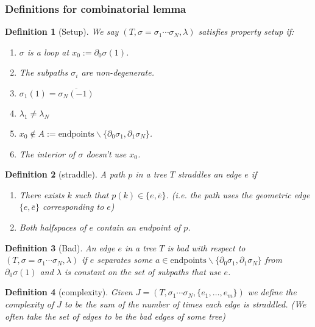 \documentclass{article}
\theoremstyle{mystyle}
\newtheorem{defn}{Definition}
\theoremstyle{remark}
\begin{document}
\subsubsection{Definitions for combinatorial lemma}
\begin{defn}
    [Setup]
    \label{def:setup} 
    We say \((T, \sigma = \sigma_{1} \cdots \sigma_{N} , \lambda)\) satisfies property {\em setup} if: 
    \begin{enumerate}
        \item \label{item:loop} \(\sigma\) is a loop at \(x_{0} := \partial_{0} \sigma (1)\).
        \item \label{item:nondegen} The subpaths \(\sigma_{i}\) are non-degenerate.
        \item \label{item:sharededge} \(\sigma_{1} (1) = \overline{ \sigma_{N} (-1) }\) 
        \item \label{item:colors} \(\lambda_{1} \neq \lambda_{N}\) 
        \item \label{item:endpoints} \(x_{0} \not\in A:= \text{endpoints} \smallsetminus \{\partial_{0} \sigma_{1} , \partial_{1} \sigma_{N}\} \).
        \item \label{item:interior} The interior of \(\sigma\) doesn't use \(x_{0}\).
    \end{enumerate}
\end{defn}
\begin{defn}
	[straddle]
	A path \(p\) in a tree \(T\) {\em straddles} an edge \(e\) if
	\begin{enumerate}
		\item There exists \(k\) such that \(p(k) \in  \{e, \overline{e}\}\). (i.e. the path uses the geometric edge \(\{e , \overline{e}\}\) corresponding to  \(e\))
		\item Both halfspaces of \(e\) contain an endpoint of \(p\).
	\end{enumerate}
\end{defn}
\begin{defn}
    [Bad]
    An edge \(e\) in a tree \(T\) is {\em bad} with respect to \((T, \sigma = \sigma_{1} \cdots \sigma_{N} , \lambda)\) if \(e\) separates some \(a \in \text{endpoints} \smallsetminus \{\partial_{0} \sigma_{1} , \partial_{1} \sigma_{N}\}\) from \(\partial_{0}\sigma (1)\) and \(\lambda\) is constant on the set of subpaths that use \(e\).
\end{defn}
\begin{defn}
	[complexity]
    Given \(J=(T, \sigma_{1} \cdots \sigma_{N} , \{e_{1} , \ldots, e_{m}\})\) we define the {\em complexity} of \(J\) to be the sum of the number of times each edge is straddled. (We often take the set of edges to be the bad edges of some tree)
\end{defn}
\end{document}
